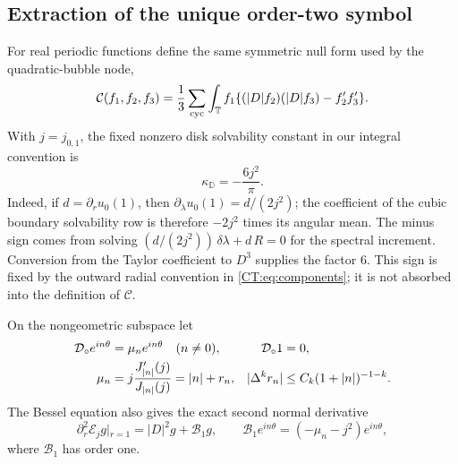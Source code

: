 \documentclass[11pt]{amsart}
\numberwithin{equation}{section}
\theoremstyle{definition}
\theoremstyle{remark}
\newcommand{\T}{\mathbb T}
\newcommand{\Dop}{|D|}
\newcommand{\Cnull}{\mathcal C}
\begin{document}
\subsection{Extraction of the unique order-two symbol}

For real periodic functions define the same symmetric null form used by
the quadratic-bubble node,
\begin{equation}\label{CT:eq:null}
 \Cnull(f_1,f_2,f_3)
 =\frac13\sum_{\rm cyc}
 \int_\T f_1\{(\Dop f_2)(\Dop f_3)-f_2'f_3'\}.
\end{equation}
With $j=j_{0,1}$, the fixed nonzero disk solvability constant in our
integral convention is
\begin{equation}\label{CT:eq:kappa}
 \boxed{\kappa_{\mathbb D}=-\frac{6j^2}{\pi}}.
\end{equation}
Indeed, if $d=\partial_ru_0(1)$, then
$\partial_\lambda u_0(1)=d/(2j^2)$; the coefficient of the cubic boundary
solvability row is therefore $-2j^2$ times its angular mean.  The minus
sign comes from solving
\(
 (d/(2j^2))\,\delta\lambda+d\,R=0
\)
for the spectral increment.  Conversion from the Taylor coefficient to
$D^3$ supplies the factor $6$.  This sign is fixed by the outward radial
convention in \eqref{CT:eq:components}; it is not absorbed into the definition
of \(\Cnull\).

On the nongeometric subspace let
\begin{align}
 \mathcal D_\circ e^{in\theta}&=\mu_ne^{in\theta}\quad(n\ne0),
 &\mathcal D_\circ1&=0,\label{CT:eq:DtN}\\
 \mu_n&=j\frac{J_{|n|}'(j)}{J_{|n|}(j)}=|n|+r_n,
 &|\Delta^kr_n|&\le C_k(1+|n|)^{-1-k}.\notag
\end{align}
The Bessel equation also gives the exact second normal derivative
\begin{equation}\label{CT:eq:rr-exact}
 \partial_r^2\mathcal E_jg|_{r=1}
 =\Dop^2g+\mathcal B_1g,
 \qquad
 \mathcal B_1e^{in\theta}=(-\mu_n-j^2)e^{in\theta},
\end{equation}
where $\mathcal B_1$ has order one.
\end{document}
